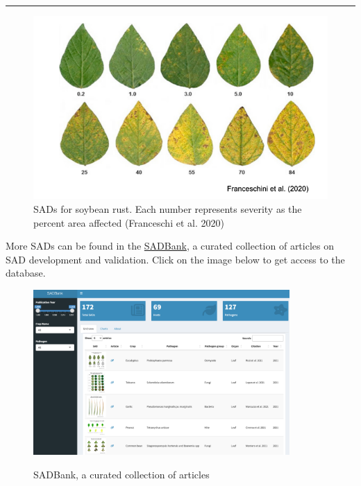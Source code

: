 \documentclass[
  letterpaper,
  DIV=11,
  numbers=noendperiod]{scrreprt}
\begin{document}
\begin{center}\rule{0.5\linewidth}{0.5pt}\end{center}

\begin{figure}

{\centering \includegraphics[width=6.51042in,height=\textheight]{imgs/sad-sbr.png}

}

\caption{\label{fig-sad-sbr}SADs for soybean rust. Each number
represents severity as the percent area affected (Franceschi et al.
2020)}

\end{figure}

More SADs can be found in the
\href{https://emdelponte.github.io/sadbank/}{SADBank}, a curated
collection of articles on SAD development and validation. Click on the
image below to get access to the database.

\begin{figure}

{\centering 

\href{https://emdelponte.github.io/sadbank/}{\includegraphics[width=0.87\textwidth,height=\textheight]{imgs/sadbank.png}}

}

\caption{\label{fig-sadbank}SADBank, a curated collection of articles}

\end{figure}
\end{document}
